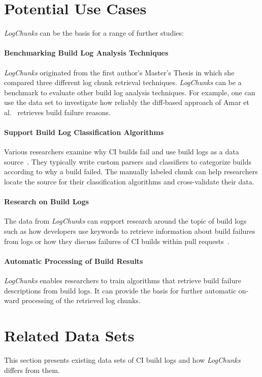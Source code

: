 \documentclass[sigconf]{acmart}
\newcommand{\logchunks}{\emph{LogChunks}\xspace}
\begin{document}
\section{Potential Use Cases}

\logchunks can be the basis for a range of further studies:

\paragraph{Benchmarking Build Log Analysis Techniques}
\logchunks originated from the first author's Master's Thesis in which she compared three different log chunk retrieval techniques. %
\logchunks can be a benchmark to evaluate other build log analysis techniques.
For example, one can use the data set to investigate how reliably the diff-based approach of Amar et al.~\cite{amar2019mining} retrieves build failure reasons.

\paragraph{Support Build Log Classification Algorithms}
Various researchers examine why CI builds fail and use build logs as a data source~\cite{seo2014programmers,vassallo2017a-tale}.
They typically write custom parsers and classifiers to categorize builds according to why a build failed.
The manually labeled chunk can help researchers locate the source for their classification algorithms and cross-validate their data.

\paragraph{Research on Build Logs}
The data from \logchunks can support research around the topic of build logs such as how developers use keywords to retrieve information about build failures from logs or how they discuss failures of CI builds within pull requests~\cite{cassee2019silent}.

\paragraph{Automatic Processing of Build Results}
\logchunks enables researchers to train algorithms that retrieve build failure
descriptions from build logs. It can provide the basis for further automatic
on-ward processing of the retrieved log chunks.

\section{Related Data Sets}
\label{sec:related-data-sets}
This section presents existing data sets of CI build logs and how
\logchunks differs from them.
\end{document}
